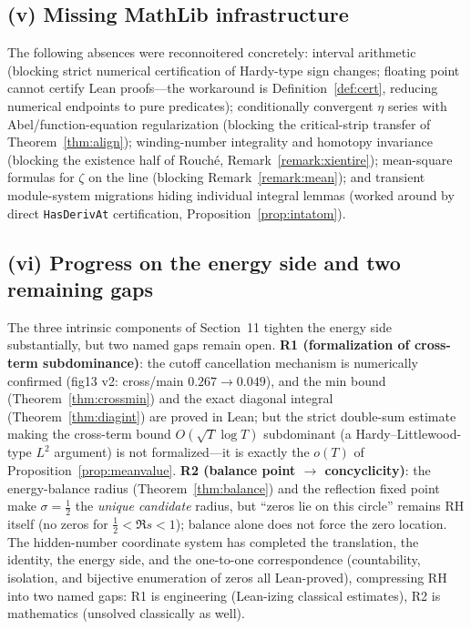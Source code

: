 \documentclass[submission]{jsfds}
\newcommand{\Lean}[1]{\texttt{#1}}
\begin{document}
\subsection*{(v) Missing MathLib infrastructure}
The following absences were reconnoitered concretely: interval arithmetic
(blocking strict numerical certification of Hardy-type sign changes; floating
point cannot certify Lean proofs---the workaround is
Definition~\ref{def:cert}, reducing numerical endpoints to pure predicates);
conditionally convergent $\eta$ series with Abel/function-equation
regularization (blocking the critical-strip transfer of
Theorem~\ref{thm:align}); winding-number integrality and homotopy invariance
(blocking the existence half of Rouch\'e, Remark~\ref{remark:xientire});
mean-square formulas for $\zeta$ on the line (blocking
Remark~\ref{remark:mean}); and transient module-system migrations hiding
individual integral lemmas (worked around by direct
\Lean{HasDerivAt} certification, Proposition~\ref{prop:intatom}).

\subsection*{(vi) Progress on the energy side and two remaining gaps}
The three intrinsic components of Section~11 tighten the energy side
substantially, but two named gaps remain open.
\textbf{R1 (formalization of cross-term subdominance)}: the cutoff
cancellation mechanism is numerically confirmed (fig13 v2:
cross/main $0.267\to0.049$), and the min bound
(Theorem~\ref{thm:crossmin}) and the exact diagonal integral
(Theorem~\ref{thm:diagint}) are proved in Lean; but the strict double-sum
estimate making the cross-term bound $O(\sqrt{T}\log T)$ subdominant
(a Hardy--Littlewood-type $L^2$ argument) is not formalized---it is
exactly the $o(T)$ of Proposition~\ref{prop:meanvalue}.
\textbf{R2 (balance point $\to$ concyclicity)}: the energy-balance radius
(Theorem~\ref{thm:balance}) and the reflection fixed point make
$\sigma=\tfrac12$ the \emph{unique candidate} radius, but ``zeros lie on
this circle'' remains RH itself (no zeros for $\tfrac12<\Re s<1$);
balance alone does not force the zero location. The hidden-number
coordinate system has completed the translation, the identity, the energy
side, and the one-to-one correspondence (countability, isolation, and
bijective enumeration of zeros all Lean-proved), compressing RH into two
named gaps: R1 is engineering (Lean-izing classical estimates), R2 is
mathematics (unsolved classically as well).
\end{document}
